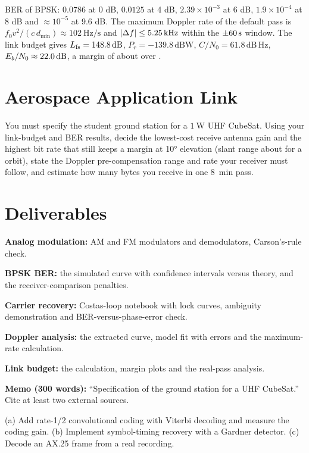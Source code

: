 \documentclass[11pt,a4paper]{article}
\begin{document}
\begin{checkpoint}
BER of BPSK: $0.0786$ at 0 dB, $0.0125$ at 4 dB, $2.39\times10^{-3}$ at 6 dB, $1.9\times10^{-4}$ at 8 dB and $\approx10^{-5}$ at 9.6 dB. The maximum Doppler rate of the default pass is $f_0v^2/(c\,d_{\min})\approx\SI{102}{\hertz\per\second}$ and $|\Delta f|\le\SI{5.25}{\kilo\hertz}$ within the $\pm\SI{60}{\second}$ window. The link budget gives $L_{\rm fs}=\dB{148.8}$, $P_r=-139.8\,\mathrm{dBW}$, $C/N_0=61.8\,\mathrm{dB\,Hz}$, $E_b/N_0\approx\dB{22.0}$, a margin of about  over .
\end{checkpoint}

\section*{Aerospace Application Link}
You must specify the student ground station for a $\SI{1}{\watt}$ UHF CubeSat. Using your link-budget and BER results, decide the lowest-cost receive antenna gain and the highest bit rate that still keeps a  margin at \ang{10} elevation (slant range about  for a  orbit), state the Doppler pre-compensation range and rate your receiver must follow, and estimate how many bytes you receive in one \SI{8}{\minute} pass.

\section*{Deliverables}
\begin{delivs}
  \item[D1] \textbf{Analog modulation:} AM and FM modulators and demodulators, Carson's-rule check.
  \item[D2] \textbf{BPSK BER:} the simulated curve with confidence intervals versus theory, and the receiver-comparison penalties.
  \item[D3] \textbf{Carrier recovery:} Costas-loop notebook with lock curves, ambiguity demonstration and BER-versus-phase-error check.
  \item[D4] \textbf{Doppler analysis:} the extracted curve, model fit with errors and the maximum-rate calculation.
  \item[D5] \textbf{Link budget:} the calculation, margin plots and the real-pass analysis.
  \item[D6] \textbf{Memo (300 words):} ``Specification of the ground station for a UHF CubeSat.'' Cite at least two external sources.
  \item[Bonus] (a) Add rate-1/2 convolutional coding with Viterbi decoding and measure the coding gain. (b) Implement symbol-timing recovery with a Gardner detector. (c) Decode an AX.25 frame from a real recording.
\end{delivs}
\end{document}
